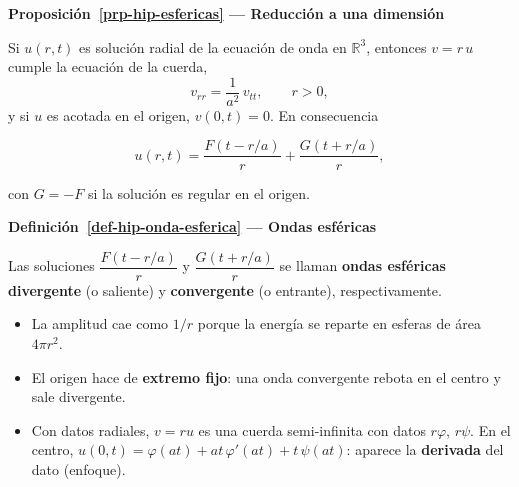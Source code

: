 \documentclass[
  spanish,
  a4paper,
]{scrbook}
\providecommand{\tightlist}{%
  \setlength{\itemsep}{0pt}\setlength{\parskip}{0pt}}
\theoremstyle{definition}
\theoremstyle{plain}
\theoremstyle{definition}
\theoremstyle{plain}
\theoremstyle{definition}
\theoremstyle{remark}
\begin{document}
\begin{tcolorbox}[enhanced jigsaw, arc=.35mm, bottomrule=.15mm, breakable, colback=white, colframe=quarto-callout-note-color-frame, left=2mm, leftrule=.75mm, opacityback=0, rightrule=.15mm, toprule=.15mm]
\begin{minipage}[t]{5.5mm}
\textcolor{quarto-callout-note-color}{\faInfo}
\end{minipage}%
\begin{minipage}[t]{\textwidth - 5.5mm}

\vspace{-3mm}\textbf{Proposición~\ref{prp-hip-esfericas} --- Reducción a una dimensión}\vspace{3mm}

Si \(u(r,t)\) es solución radial de la ecuación de onda en
\(\mathbb R^3\), entonces \(v = r\,u\) cumple la ecuación de la cuerda,
\[
v_{rr} = \frac1{a^2}\,v_{tt}, \qquad r>0,
\] y si \(u\) es acotada en el origen, \(v(0,t) = 0\). En consecuencia

\[
u(r,t) = \frac{F(t - r/a)}{r} + \frac{G(t + r/a)}{r},
\]

con \(G = -F\) si la solución es regular en el origen.

\end{minipage}%
\end{tcolorbox}

\begin{tcolorbox}[enhanced jigsaw, arc=.35mm, bottomrule=.15mm, breakable, colback=white, colframe=quarto-callout-note-color-frame, left=2mm, leftrule=.75mm, opacityback=0, rightrule=.15mm, toprule=.15mm]
\begin{minipage}[t]{5.5mm}
\textcolor{quarto-callout-note-color}{\faInfo}
\end{minipage}%
\begin{minipage}[t]{\textwidth - 5.5mm}

\vspace{-3mm}\textbf{Definición~\ref{def-hip-onda-esferica} --- Ondas esféricas}\vspace{3mm}

Las soluciones \(\dfrac{F(t-r/a)}{r}\) y \(\dfrac{G(t+r/a)}{r}\) se
llaman \textbf{ondas esféricas} \textbf{divergente} (o saliente) y
\textbf{convergente} (o entrante), respectivamente.

\end{minipage}%
\end{tcolorbox}

\begin{itemize}
\tightlist
\item
  La amplitud cae como \(1/r\) porque la energía se reparte en esferas
  de área \(4\pi r^2\).
\item
  El origen hace de \textbf{extremo fijo}: una onda convergente rebota
  en el centro y sale divergente.
\item
  Con datos radiales, \(v = ru\) es una cuerda semi-infinita con datos
  \(r\varphi\), \(r\psi\). En el centro,
  \(u(0,t) = \varphi(at) + at\,\varphi'(at) + t\,\psi(at)\): aparece la
  \textbf{derivada} del dato (enfoque).
\end{itemize}
\end{document}

